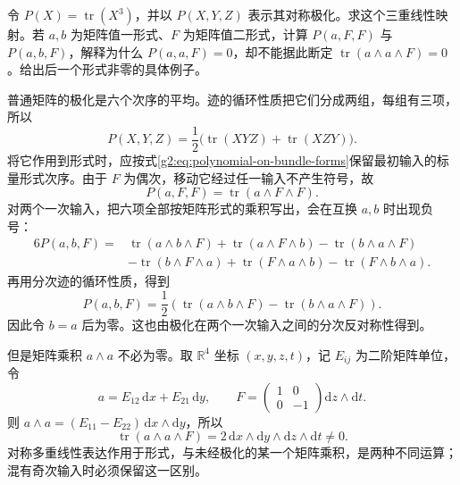 \BookExercises
\begin{exercise}\label{g2:ex:polarized-cubic-mixed-forms}
	令 \(P(X)=\operatorname{tr}(X^3)\)，并以 \(P(X,Y,Z)\) 表示其对称极化。求这个三重线性映射。若 \(a,b\) 为矩阵值一形式、\(F\) 为矩阵值二形式，计算 \(P(a,F,F)\) 与 \(P(a,b,F)\)，解释为什么 \(P(a,a,F)=0\)，却不能据此断定 \(\operatorname{tr}(a\wedge a\wedge F)=0\)。给出后一个形式非零的具体例子。
\end{exercise}
\begin{solution}
	普通矩阵的极化是六个次序的平均。迹的循环性质把它们分成两组，每组有三项，所以
	\[
		P(X,Y,Z)=\frac12\bigl(\operatorname{tr}(XYZ)+\operatorname{tr}(XZY)\bigr).
	\]
	将它作用到形式时，应按式\eqref{g2:eq:polynomial-on-bundle-forms}保留最初输入的标量形式次序。由于 \(F\) 为偶次，移动它经过任一输入不产生符号，故
	\[
		P(a,F,F)=\operatorname{tr}(a\wedge F\wedge F).
	\]
	对两个一次输入，把六项全部按矩阵形式的乘积写出，会在互换 \(a,b\) 时出现负号：
	\[
	\begin{aligned}
		6P(a,b,F)={}&\operatorname{tr}(a\wedge b\wedge F)
		+\operatorname{tr}(a\wedge F\wedge b)
		-\operatorname{tr}(b\wedge a\wedge F)\\
		&-\operatorname{tr}(b\wedge F\wedge a)
		+\operatorname{tr}(F\wedge a\wedge b)
		-\operatorname{tr}(F\wedge b\wedge a).
	\end{aligned}
	\]
	再用分次迹的循环性质，得到
	\[
		P(a,b,F)=\frac12\left(\operatorname{tr}(a\wedge b\wedge F)
		-\operatorname{tr}(b\wedge a\wedge F)\right).
	\]
	因此令 \(b=a\) 后为零。这也由极化在两个一次输入之间的分次反对称性得到。

	但是矩阵乘积 \(a\wedge a\) 不必为零。取 \(\mathbb R^4\) 坐标 \((x,y,z,t)\)，记 \(E_{ij}\) 为二阶矩阵单位，令
	\[
		a=E_{12}\,\mathrm dx+E_{21}\,\mathrm dy,
		\qquad F=\begin{pmatrix}1&0\\0&-1\end{pmatrix}\mathrm dz\wedge\mathrm dt.
	\]
	则 \(a\wedge a=(E_{11}-E_{22})\,\mathrm dx\wedge\mathrm dy\)，所以
	\[
		\operatorname{tr}(a\wedge a\wedge F)
		=2\,\mathrm dx\wedge\mathrm dy\wedge\mathrm dz\wedge\mathrm dt\ne0.
	\]
	对称多重线性表达作用于形式，与未经极化的某一个矩阵乘积，是两种不同运算；混有奇次输入时必须保留这一区别。
\end{solution}

